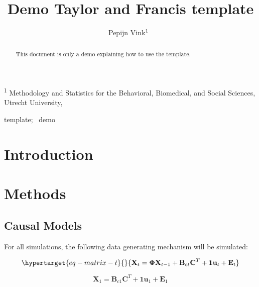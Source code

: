 \documentclass[
]{interact}
\title{Demo Taylor and Francis template}
\author{Pepijn
Vink$\textsuperscript{1}$~\orcidlink{0000-0001-6960-9904}}
\begin{document}
\captionsetup{labelsep=space}
\maketitle
\textsuperscript{1} Methodology and Statistics for the Behavioral,
Biomedical, and Social Sciences, Utrecht University,  
\begin{abstract}
This document is only a demo explaining how to use the template.
\end{abstract}
\begin{keywords}
\def\sep{;\ }
template\sep 
demo
\end{keywords}
\ifdefined\Shaded\renewenvironment{Shaded}{\begin{tcolorbox}[sharp corners, interior hidden, borderline west={3pt}{0pt}{shadecolor}, boxrule=0pt, breakable, frame hidden, enhanced]}{\end{tcolorbox}}\fi

\hypertarget{introduction}{%
\section{Introduction}\label{introduction}}

\hypertarget{methods}{%
\section{Methods}\label{methods}}

\hypertarget{causal-models}{%
\subsection{Causal Models}\label{causal-models}}

For all simulations, the following data generating mechanism will be
simulated:

\begin{equation}\protect\hypertarget{eq-matrix-t}{}{
\textbf{X}_t = \boldsymbol{\Phi}\textbf{X}_{t-1} + \textbf{B}_{ct}\textbf{C}^T + \textbf{1}\textbf{u}_t + \textbf{E}_t
}\label{eq-matrix-t}\end{equation}

\[
\textbf{X}_1 = \textbf{B}_{c1}\textbf{C}^T + \textbf{1}\textbf{u}_1 + \textbf{E}_1
\]
\end{document}
